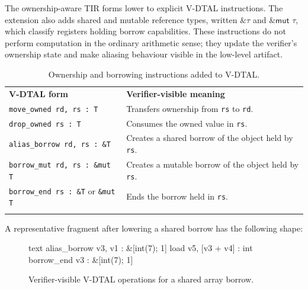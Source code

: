 
The ownership-aware TIR forms lower to explicit V-DTAL instructions. The extension also adds shared and mutable reference types, written $\&\tau$ and $\&\textsf{mut } \tau$, which classify registers holding borrow capabilities. These instructions do not perform computation in the ordinary arithmetic sense; they update the verifier's ownership state and make aliasing behaviour visible in the low-level artifact.

\begin{table}[H]
\centering
\small
\begin{tabular}{p{} p{}}
\tablehline
\textbf{V-DTAL form} & \textbf{Verifier-visible meaning} \\
\tablehline
\texttt{move\_owned rd, rs : T} & Transfers ownership from \texttt{rs} to \texttt{rd}. \\
\texttt{drop\_owned rs : T} & Consumes the owned value in \texttt{rs}. \\
\texttt{alias\_borrow rd, rs : \&T} & Creates a shared borrow of the object held by \texttt{rs}. \\
\texttt{borrow\_mut rd, rs : \&mut T} & Creates a mutable borrow of the object held by \texttt{rs}. \\
\texttt{borrow\_end rs : \&T} or \texttt{\&mut T} & Ends the borrow held in \texttt{rs}. \\
\tablehline
\end{tabular}
\caption{Ownership and borrowing instructions added to V-DTAL.}
\label{tab:dtal-ownership-forms}
\end{table}

A representative fragment after lowering a shared borrow has the following shape:

\begin{figure}[H]
\begin{center}
\begin{cminted}{text}
alias_borrow v3, v1    : &[int(7); 1]
load v5, [v3 + v4]     : int
borrow_end v3          : &[int(7); 1]
\end{cminted}
\end{center}
\caption{Verifier-visible V-DTAL operations for a shared array borrow.}
\label{fig:dtal-shared-borrow}
\end{figure}

